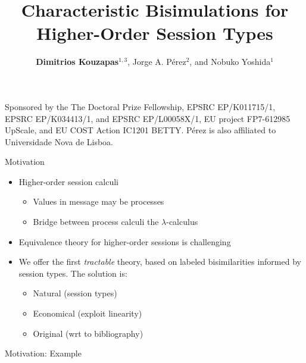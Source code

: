\documentclass{beamer}
\title{Characteristic Bisimulations for Higher-Order Session Types}
\author{{\bf Dimitrios Kouzapas$^{1,3}$}, Jorge A. P\'{e}rez$^{2}$, and Nobuko Yoshida$^1$}
\institute{Imperial College London$^1$, University of Groningen$^2$, University of Glasgow$^3$}
\date
\begin{document}
	\begin{frame}
		\titlepage

		{ \tiny %
		Sponsored by the The Doctoral Prize Fellowship, EPSRC EP/K011715/1,
		EPSRC EP/K034413/1, and EPSRC EP/L00058X/1,
		EU project FP7-612985 UpScale, and EU COST Action IC1201 BETTY.  
		P\'{e}rez is  also affiliated to
		Universidade Nova de Lisboa.%
		}
	\end{frame}

	\begin{frame}{Motivation}
		\begin{itemize}
			\item	Higher-order session calculi

				\begin{itemize}
					\item	Values in message may be processes
					\item	Bridge between process calculi the $\lambda$-calculus
				\end{itemize}


			\item	Equivalence theory for higher-order sessions is challenging

			\item	We offer the first {\em tractable} theory, based on labeled bisimilarities
				informed by session types. The solution is:
				\begin{itemize}
					\item	Natural (session types)
					\item	Economical (exploit linearity)
					\item	Original (wrt to bibliography)
				\end{itemize}
		\end{itemize}
	\end{frame}

	\begin{frame}{Motivation: Example}
		
	\end{frame}
\end{document}
